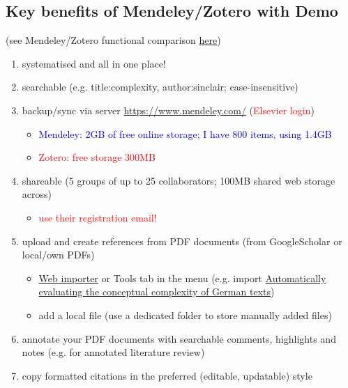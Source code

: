 \documentclass[a4paper,11pt]{article}
\begin{document}
\subsection{Key benefits of Mendeley/Zotero with Demo}
(see Mendeley/Zotero functional comparison \href{https://en.wikipedia.org/wiki/Comparison\_of\_reference\_management\_software}{here})
\begin{enumerate}
	\item systematised and all in one place!
	\item searchable (e.g. title:complexity, author:sinclair; case-insensitive)
	\item backup/sync via server \url{https://www.mendeley.com/} (\textcolor{red}{Elsevier login})
		\begin{itemize}
		\item \textcolor{blue}{Mendeley: 2GB of free online storage; I have 800 items, using 1.4GB}
		\item \textcolor{red}{Zotero: free storage 300MB}
		\end{itemize}
	\item shareable (5 groups of up to 25 collaborators; 100MB shared web storage across) %
	\begin{itemize}
		\item \textcolor{red}{use their registration email!}
	\end{itemize}
	\item upload and create references from PDF documents (from GoogleScholar or local/own PDFs)
		\begin{itemize}	
			\item \href{https://www.mendeley.com/reference-management/web-importer}{Web importer} or Tools tab in the menu (e.g. import \href{https://aclanthology.org/2021.konvens-1.23.pdf}{Automatically evaluating the conceptual complexity of German texts})
			\item add a local file (use a dedicated folder to store manually added files)
		\end{itemize}
	\item annotate your PDF documents with searchable comments, highlights and notes (e.g. for annotated literature review)
	\item copy formatted citations in the preferred (editable, updatable) style 


\end{enumerate}
\end{document}
